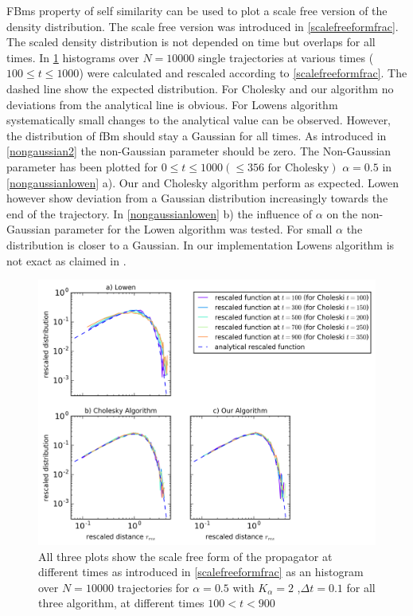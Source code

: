 \documentclass[
  a4paper,BCOR10mm,oneside,
  headsepline,footsepline,%
  fleqn,openbib
]{scrbook}
\begin{document}
FBms property of self similarity can be used to plot a scale free version of the density distribution. The scale free version was introduced in \cref{scalefreeformfrac}. The scaled density distribution is not depended on time but overlaps for all times. In \cref{rescaledfunction}  histograms over $N=10000$ single trajectories at various times ($100\leq t \leq 1000$) were calculated and rescaled according to \cref{scalefreeformfrac}. The dashed line show the expected distribution. For Cholesky and our algorithm no deviations from the analytical line is obvious. For Lowens algorithm systematically small changes to the analytical value can be observed. However, the distribution of fBm should stay a Gaussian for all times.  As introduced in \cref{nongaussian2} the non-Gaussian parameter should be zero. The Non-Gaussian parameter has been plotted for $0 \leq t \leq 1000 (\leq 356 \text{ for Cholesky})$  $\alpha=0.5$  in \cref{nongaussianlowen} a). Our and Cholesky algorithm perform as expected. Lowen however show deviation from a Gaussian distribution increasingly towards the end of the trajectory. In  \cref{nongaussianlowen} b) the influence of $\alpha$ on the non-Gaussian parameter for the Lowen algorithm was tested. For small $\alpha$ the distribution is closer to a Gaussian. In our implementation Lowens algorithm is not exact as claimed in \cite{Lowen1999}.

\begin{figure}[h!]
\centering
\includegraphics[width=\textwidth]{./data/scaledfunctionneu.png}
\caption{All three plots show the scale free form of the propagator at different times as introduced in \cref{scalefreeformfrac} as an histogram over $N=10000$ trajectories for $\alpha=0.5$  with $K_{\alpha}=2$ ,$\Delta t = 0.1$ for all three algorithm, at different times $100<t<900$}
\label{rescaledfunction}
\end{figure}
\end{document}
